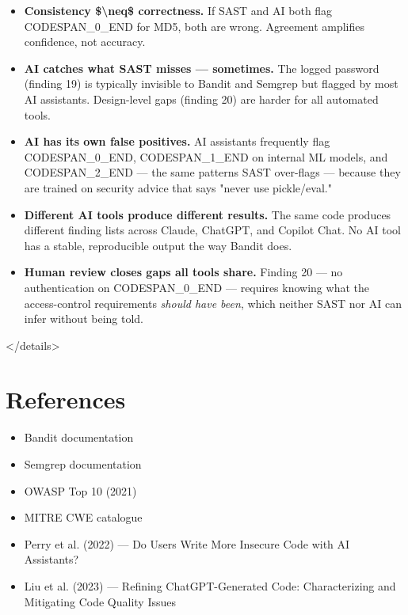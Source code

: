 \documentclass[11pt,a4paper]{book}
\begin{document}
\begin{itemize}
  \item \textbf{Consistency \$\textbackslash{}neq\$ correctness.} If SAST and AI both flag CODESPAN\_0\_END for MD5, both are wrong. Agreement amplifies confidence, not accuracy.
  \item \textbf{AI catches what SAST misses --- sometimes.} The logged password (finding 19) is typically invisible to Bandit and Semgrep but flagged by most AI assistants. Design-level gaps (finding 20) are harder for all automated tools.
  \item \textbf{AI has its own false positives.} AI assistants frequently flag CODESPAN\_0\_END, CODESPAN\_1\_END on internal ML models, and CODESPAN\_2\_END --- the same patterns SAST over-flags --- because they are trained on security advice that says "never use pickle/eval."
  \item \textbf{Different AI tools produce different results.} The same code produces different finding lists across Claude, ChatGPT, and Copilot Chat. No AI tool has a stable, reproducible output the way Bandit does.
  \item \textbf{Human review closes gaps all tools share.} Finding 20 --- no authentication on CODESPAN\_0\_END --- requires knowing what the access-control requirements \textit{should have been}, which neither SAST nor AI can infer without being told.
\end{itemize}

</details>

\medskip

\section{References}

\begin{itemize}
  \item Bandit documentation
  \item Semgrep documentation
  \item OWASP Top 10 (2021)
  \item MITRE CWE catalogue
  \item Perry et al. (2022) --- Do Users Write More Insecure Code with AI Assistants?
  \item Liu et al. (2023) --- Refining ChatGPT-Generated Code: Characterizing and Mitigating Code Quality Issues
\end{itemize}

\end{document}
